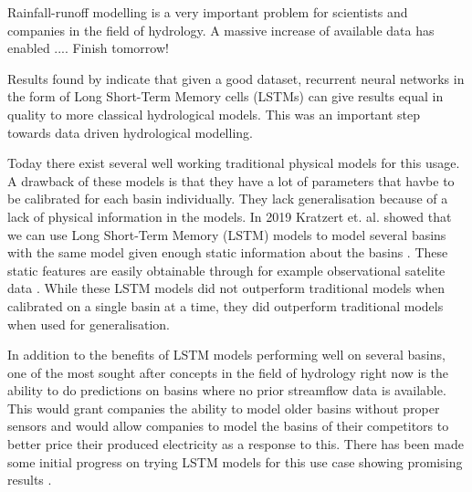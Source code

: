 Rainfall-runoff modelling is a very important problem for scientists and 
companies in the field of hydrology.
A massive increase of available data has enabled .... Finish tomorrow!

Results found by \citet{lstm_first_paper} indicate that given a good dataset,
recurrent neural networks in the form of Long Short-Term Memory cells (LSTMs)
can give results equal in quality to more classical hydrological models.
This was an important step towards data driven hydrological modelling. 

Today there exist several well working traditional physical models for this usage. \citationneeded
A drawback of these models is that they have a lot of parameters that havbe to be 
calibrated for each basin individually. They lack generalisation because of a lack of 
physical information in the models. \citationneeded In 2019 Kratzert et. al. showed
that we can use Long Short-Term Memory (LSTM) models to model several basins with the same model
given enough static information about the basins \citep{lstm_second_paper}. These 
static features are easily obtainable through for example observational satelite 
data \citep{CAMELS_US}. While these LSTM models did not outperform traditional models when calibrated on a single basin at 
a time, they did outperform traditional models when used for generalisation.

In addition to the benefits of LSTM models performing well on several basins, 
one of the most sought after concepts in the field of hydrology right now is the 
ability to do predictions on basins where no prior streamflow data is available. \citationneeded
This would grant companies the ability to model older basins without proper sensors
and would allow companies to model the basins of their competitors to better price 
their produced electricity as a response to this. There has been made some initial 
progress on trying LSTM models for this use case showing promising results \citep{lstm_third_paper}. 

